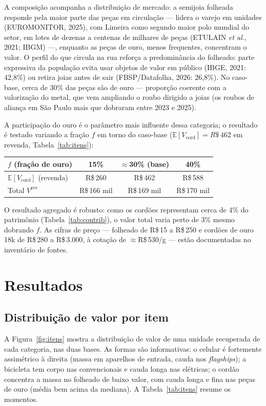 \documentclass[11pt,a4paper]{article}
\newcommand{\reais}[1]{R\$\,#1}
\begin{document}
A composição acompanha a distribuição de mercado: a semijoia folheada responde pela maior parte das
peças em circulação --- lidera o varejo em unidades (EUROMONITOR, 2025), com Limeira como segundo
maior polo mundial do setor, em lotes de dezenas a centenas de milhares de peças (ETULAIN
\emph{et al.}, 2021; IBGM) ---, enquanto as peças de ouro, menos frequentes, concentram o valor. O
perfil do que circula na rua reforça a predominância do folheado: parte expressiva da população
evita usar objetos de valor em público (IBGE, 2021: 42,8\%) ou retira joias antes de sair
(FBSP/Datafolha, 2026: 26,8\%). No caso-base, cerca de 30\% das peças são de ouro --- proporção
coerente com a valorização do metal, que vem ampliando o roubo dirigido a joias (os roubos de
aliança em São Paulo mais que dobraram entre 2023 e 2025).

A participação do ouro é o parâmetro mais influente dessa categoria; o resultado é testado variando
a fração $f$ em torno do caso-base ($\mathbb{E}[V_{\text{cord}}]=\reais{462}$ em revenda,
Tabela~\ref{tab:itens}):
\begin{center}\small
\begin{tabular}{lccc}
\toprule
$f$ (fração de ouro) & 15\% & $\approx$30\% (base) & 40\% \\
\midrule
$\mathbb{E}[V_{\text{cord}}]$ (revenda) & \reais{260} & \reais{462} & \reais{588} \\
Total $V^{\text{rev}}$ & \reais{166} mil & \reais{169} mil & \reais{170} mil \\
\bottomrule
\end{tabular}
\end{center}
O resultado agregado é robusto: como os cordões representam cerca de 4\% do patrimônio
(Tabela~\ref{tab:contrib}), o valor total varia perto de 3\% mesmo dobrando $f$. As cifras de preço
--- folheado de \reais{15} a \reais{250} e cordões de ouro 18k de \reais{280} a \reais{3.000}, à
cotação de $\approx$\reais{530}/g --- estão documentadas no inventário de fontes.


\section{Resultados}

\subsection{Distribuição de valor por item}
A Figura~\ref{fig:itens} mostra a distribuição de valor de uma unidade recuperada de cada
categoria, nas duas bases. As formas são informativas: o celular é fortemente assimétrico à
direita (massa em aparelhos de entrada, cauda nos \emph{flagships}); a bicicleta tem corpo nas
convencionais e cauda longa nas elétricas; o cordão concentra a massa no folheado de baixo valor,
com cauda longa e fina nas peças de ouro (média bem acima da mediana). A
Tabela~\ref{tab:itens} resume os momentos.
\end{document}
